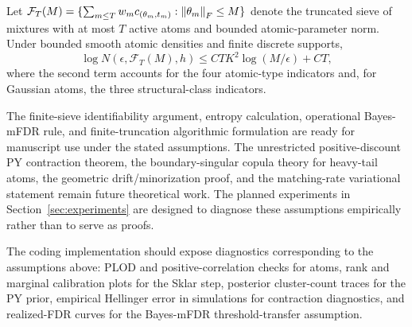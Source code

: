 \begin{lemma}
\label{lem:cover}
Let $\mathcal F_T(M)=\{\sum_{m\leq T}w_m c_{(\theta_m,t_m)}:\left\lVert \theta_m \right\rVert_F\leq M\}$ denote the truncated sieve of mixtures with at most $T$ active atoms and bounded atomic-parameter norm. Under bounded smooth atomic densities and finite discrete supports,
\[
\log N(\epsilon,\mathcal F_T(M),h)\leq C T K^2\log(M/\epsilon)+CT,
\]
where the second term accounts for the four atomic-type indicators and, for Gaussian atoms, the three structural-class indicators.
\end{lemma}

\begin{remark}
\label{rem:theory-roadmap}
The finite-sieve identifiability argument, entropy calculation, operational Bayes-mFDR rule, and finite-truncation algorithmic formulation are ready for manuscript use under the stated assumptions. The unrestricted positive-discount PY contraction theorem, the boundary-singular copula theory for heavy-tail atoms, the geometric drift/minorization proof, and the matching-rate variational statement remain future theoretical work. The planned experiments in Section~\ref{sec:experiments} are designed to diagnose these assumptions empirically rather than to serve as proofs.
\end{remark}

\begin{remark}
\label{rem:theory-code}
The coding implementation should expose diagnostics corresponding to the assumptions above: PLOD and positive-correlation checks for atoms, rank and marginal calibration plots for the Sklar step, posterior cluster-count traces for the PY prior, empirical Hellinger error in simulations for contraction diagnostics, and realized-FDR curves for the Bayes-mFDR threshold-transfer assumption.
\end{remark}
